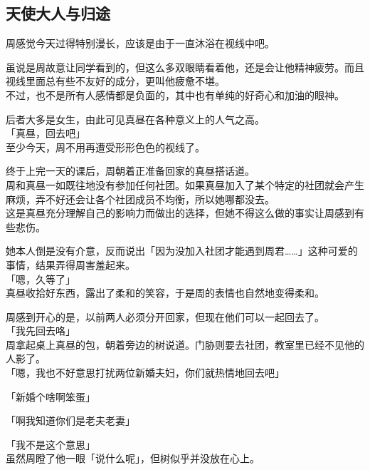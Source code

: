 \subsection{天使大人与归途}

周感觉今天过得特别漫长，应该是由于一直沐浴在视线中吧。

虽说是周故意让同学看到的，但这么多双眼睛看着他，还是会让他精神疲劳。而且视线里面总有些不友好的成分，更叫他疲惫不堪。\\

不过，也不是所有人感情都是负面的，其中也有单纯的好奇心和加油的眼神。

后者大多是女生，由此可见真昼在各种意义上的人气之高。\\

「真昼，回去吧」\\

至少今天，周不用再遭受形形色色的视线了。

终于上完一天的课后，周朝着正准备回家的真昼搭话道。\\

周和真昼一如既往地没有参加任何社团。如果真昼加入了某个特定的社团就会产生麻烦，弄不好还会让各个社团成员不均衡，所以她哪都没去。\\

这是真昼充分理解自己的影响力而做出的选择，但她不得这么做的事实让周感到有些悲伤。

她本人倒是没有介意，反而说出「因为没加入社团才能遇到周君……」这种可爱的事情，结果弄得周害羞起来。\\

「嗯，久等了」\\

真昼收拾好东西，露出了柔和的笑容，于是周的表情也自然地变得柔和。

周感到开心的是，以前两人必须分开回家，但现在他们可以一起回去了。\\

「我先回去咯」\\

周拿起桌上真昼的包，朝着旁边的树说道。门胁则要去社团，教室里已经不见他的人影了。\\

「嗯，我也不好意思打扰两位新婚夫妇，你们就热情地回去吧」

「新婚个啥啊笨蛋」

「啊我知道你们是老夫老妻」

「我不是这个意思」\\

虽然周瞪了他一眼「说什么呢」，但树似乎并没放在心上。

